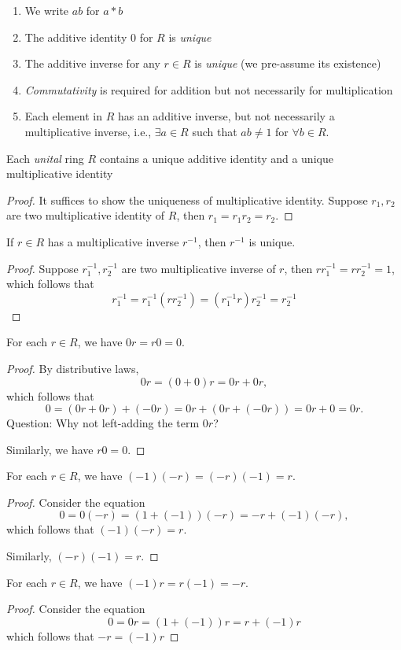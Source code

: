 \begin{remark}
\begin{enumerate}
\item
We write $ab$ for $a*b$
\item
The additive identity $0$ for $R$ is \emph{unique}
\item
The additive inverse for any $r\in R$ is \emph{unique} (we pre-assume its existence)
\item
\emph{Commutativity} is required for addition but not necessarily for multiplication
\item
Each element in $R$ has an additive inverse, but not necessarily a multiplicative inverse, i.e., $\exists a\in R$ such that $ab\ne1$ for $\forall b\in R$.
\end{enumerate}
\end{remark}
\begin{proposition}
Each \emph{unital} ring $R$ contains a unique additive identity and a unique multiplicative identity
\end{proposition}
\begin{proof}
It suffices to show the uniqueness of multiplicative identity. Suppose $r_1,r_2$ are two multiplicative identity of $R$, then $r_1=r_1r_2=r_2$.
\end{proof}
\begin{proposition}
If $r\in R$ has a multiplicative inverse $r^{-1}$, then $r^{-1}$ is unique.
\end{proposition}
\begin{proof}
Suppose $r_1^{-1},r_2^{-1}$ are two multiplicative inverse of $r$, then $rr_1^{-1}=rr_2^{-1}=1$, which follows that
\[
r_1^{-1} = r_1^{-1} (rr_2^{-1})=(r_1^{-1}r)r_2^{-1}=r_2^{-1}
\]
\end{proof}
\begin{proposition}
For each $r\in R$, we have $0r=r0=0$.
\end{proposition}
\begin{proof}
By distributive laws,
\[
0r=(0+0)r=0r+0r,
\]
which follows that
\[
0=(0r+0r)+(-0r) = 0r+(0r+(-0r))=0r+0=0r.
\]
Question: Why not left-adding the term $0r$?

Similarly, we have $r0=0$.
\end{proof}

\begin{proposition}
For each $r\in R$, we have $(-1)(-r) = (-r)(-1)=r$.
\end{proposition}
\begin{proof}
Consider the equation
\[
0 = 0(-r) = (1+(-1))(-r) = -r + (-1)(-r),
\]
which follows that $(-1)(-r)=r$.

Similarly, $(-r)(-1)=r$.
\end{proof}
\begin{proposition}
For each $r\in R$, we have $(-1)r=r(-1)=-r$.
\end{proposition}
\begin{proof}
Consider the equation
\[
0=0r=(1+(-1))r=r+(-1)r
\]
which follows that $-r=(-1)r$
\end{proof}

